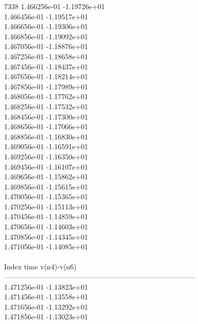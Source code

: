 7338	1.466256e-01	-1.19726e+01	\\ 	1.466456e-01	-1.19517e+01	\\ 	1.466656e-01	-1.19306e+01	\\ 	1.466856e-01	-1.19092e+01	\\ 	1.467056e-01	-1.18876e+01	\\ 	1.467256e-01	-1.18658e+01	\\ 	1.467456e-01	-1.18437e+01	\\ 	1.467656e-01	-1.18214e+01	\\ 	1.467856e-01	-1.17989e+01	\\ 	1.468056e-01	-1.17762e+01	\\ 	1.468256e-01	-1.17532e+01	\\ 	1.468456e-01	-1.17300e+01	\\ 	1.468656e-01	-1.17066e+01	\\ 	1.468856e-01	-1.16830e+01	\\ 	1.469056e-01	-1.16591e+01	\\ 	1.469256e-01	-1.16350e+01	\\ 	1.469456e-01	-1.16107e+01	\\ 	1.469656e-01	-1.15862e+01	\\ 	1.469856e-01	-1.15615e+01	\\ 	1.470056e-01	-1.15365e+01	\\ 	1.470256e-01	-1.15113e+01	\\ 	1.470456e-01	-1.14859e+01	\\ 	1.470656e-01	-1.14603e+01	\\ 	1.470856e-01	-1.14345e+01	\\ 	1.471056e-01	-1.14085e+01	\\ \hline
\\ \hline
Index   time            v(n4)-v(n6)     \\ \hline
--------------------------------------------------------------------------------\\ 	1.471256e-01	-1.13823e+01	\\ 	1.471456e-01	-1.13558e+01	\\ 	1.471656e-01	-1.13292e+01	\\ 	1.471856e-01	-1.13023e+01	\\ \hline
